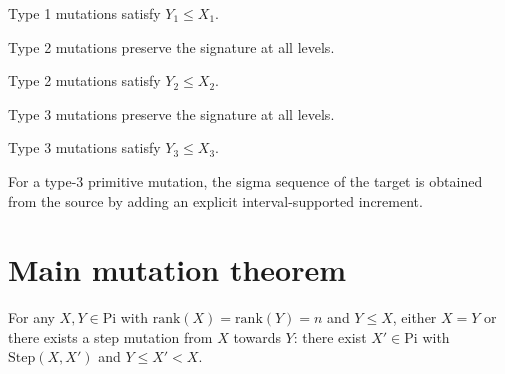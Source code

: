 \begin{lemma}
  \label{lem:mutation_type1_le}
  \leanok
  Type 1 mutations satisfy $Y_1 \le X_1$.
\end{lemma}

\begin{lemma}
  \label{lem:mutation_type2_signature_eq}
  \leanok
  Type 2 mutations preserve the signature at all levels.
\end{lemma}

\begin{lemma}
  \label{lem:mutation_type2_le}
  \leanok
  Type 2 mutations satisfy $Y_2 \le X_2$.
\end{lemma}

\begin{lemma}
  \label{lem:mutation_type3_signature_eq}
  \leanok
  Type 3 mutations preserve the signature at all levels.
\end{lemma}

\begin{lemma}
  \label{lem:mutation_type3_le}
  \leanok
  Type 3 mutations satisfy $Y_3 \le X_3$.
\end{lemma}

\begin{lemma}
  \label{lem:Sigma.mutation_type3_sigma_eq}
  \leanok
  For a type-3 primitive mutation, the sigma sequence of the target is obtained
  from the source by adding an explicit interval-supported increment.
\end{lemma}

\section{Main mutation theorem}

\begin{theorem}
  \label{thm:exists_mutation_le}
  \leanok
  For any $X, Y \in \mathrm{Pi}$ with $\mathrm{rank}(X) = \mathrm{rank}(Y) = n$ and $Y \le X$,
  either $X = Y$ or there exists a step mutation from $X$ towards $Y$:
  there exist $X' \in \mathrm{Pi}$ with $\mathrm{Step}(X, X')$ and $Y \le X' < X$.
\end{theorem}

